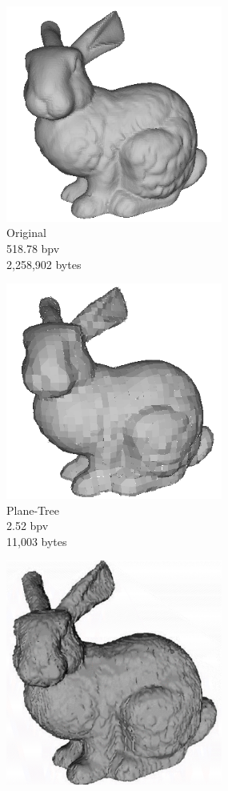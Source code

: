 \begin{figure}[H] 
        \begin{center}
 		\begin{subfigure}[b]{3in}
 			   \centering
 			   \includegraphics[width=2.8in]{images/experiments/pt_qual/original1}
 			   \captionsetup{justification=centering}
                \caption{Original\\518.78 bpv\\2,258,902 bytes}
                \label{fig:PT_SOTAQ1_ORIG}
        \end{subfigure}%
        \begin{subfigure}[b]{3in}
                \includegraphics[width=2.8in]{images/experiments/pt_qual/pt_11004}
                \captionsetup{justification=centering}
                \caption{Plane-Tree\\2.52 bpv\\11,003 bytes}
                \label{fig:PT_SOTAQ1_PLT}
        \end{subfigure}
        \begin{subfigure}[b]{3in}
                \includegraphics[width=2.8in]{images/experiments/pt_qual/tg}

\end{subfigure}
\end{center}
\end{figure}
